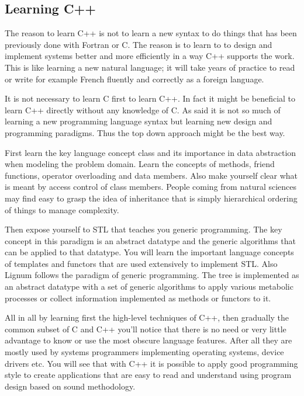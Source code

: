 \subsection{Learning C++} 

The reason to learn C++ is not to learn a new syntax to do things that
has been previously done with Fortran  or C. The reason is to learn to
to design and  implement systems better and more  efficiently in a way
C++ supports the work.  This  is like learning a new natural language;
it will  take years of  practice to read  or write for  example French
fluently and correctly as a foreign language.

It is not necessary to learn C first to learn C++. In fact it might be
beneficial to learn  C++ directly without any knowledge  of C. As said
it is  not so much of  learning a new programming  language syntax but
learning  new design  and programming  paradigms.  Thus  the  top down
approach might be the best  way.  

First learn the key language  concept class and its importance in data
abstraction when  modeling the problem domain.  Learn  the concepts of
methods, friend functions, operator overloading and data members. Also
make yourself clear what is  meant by access control of class members.
People coming from natural sciences may find easy to grasp the idea of
inheritance that  is simply hierarchical ordering of  things to manage
complexity.

Then expose yourself to STL that teaches you generic programming.  The
key concept in  this paradigm is an abstract  datatype and the generic
algorithms that can  be applied to that datatype.   You will learn the
important language  concepts of templates  and functors that  are used
extensively  to implement  STL. Also  Lignum follows  the  paradigm of
generic programming.  The tree is implemented as  an abstract datatype
with a set of generic  algorithms to apply various metabolic processes
or collect information implemented as methods or functors to it.

All in  all by learning first  the high-level techniques  of C++, then
gradually the common  subset of C and C++ you'll  notice that there is
no  need or  very little  advantage to  know or  use the  most obscure
language  features.   After  all  they  are  mostly  used  by  systems
programmers  implementing operating systems,  device drivers  etc. You
will see that with C++ it  is possible to apply good programming style
to  create applications  that are  easy to  read and  understand using
program design based on sound methodology.
   
